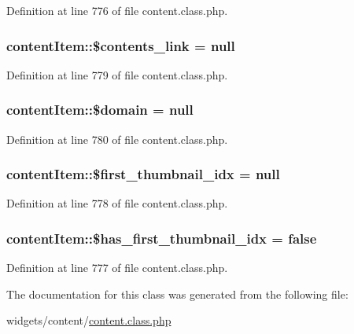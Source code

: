 Definition at line 776 of file content.\+class.\+php.

\subsubsection[{\texorpdfstring{\$contents\+\_\+link}{$contents_link}}]{\setlength{\rightskip}{0pt plus 5cm}content\+Item\+::\$contents\+\_\+link = {\bf null}}\hypertarget{classcontentItem_a6bf076b1d98025ee3f1d847fcf1fd29f}{}\label{classcontentItem_a6bf076b1d98025ee3f1d847fcf1fd29f}


Definition at line 779 of file content.\+class.\+php.

\subsubsection[{\texorpdfstring{\$domain}{$domain}}]{\setlength{\rightskip}{0pt plus 5cm}content\+Item\+::\$domain = {\bf null}}\hypertarget{classcontentItem_a428d40bc2148eae5661822963ba819b4}{}\label{classcontentItem_a428d40bc2148eae5661822963ba819b4}


Definition at line 780 of file content.\+class.\+php.

\subsubsection[{\texorpdfstring{\$first\+\_\+thumbnail\+\_\+idx}{$first_thumbnail_idx}}]{\setlength{\rightskip}{0pt plus 5cm}content\+Item\+::\$first\+\_\+thumbnail\+\_\+idx = {\bf null}}\hypertarget{classcontentItem_a3ed95afadefbe20bd085e1d88220f4b1}{}\label{classcontentItem_a3ed95afadefbe20bd085e1d88220f4b1}


Definition at line 778 of file content.\+class.\+php.

\subsubsection[{\texorpdfstring{\$has\+\_\+first\+\_\+thumbnail\+\_\+idx}{$has_first_thumbnail_idx}}]{\setlength{\rightskip}{0pt plus 5cm}content\+Item\+::\$has\+\_\+first\+\_\+thumbnail\+\_\+idx = false}\hypertarget{classcontentItem_a78da7867160d34bf7e422524f6a78c37}{}\label{classcontentItem_a78da7867160d34bf7e422524f6a78c37}


Definition at line 777 of file content.\+class.\+php.



The documentation for this class was generated from the following file\+:\begin{DoxyCompactItemize}
\item 
widgets/content/\hyperlink{content_8class_8php}{content.\+class.\+php}\end{DoxyCompactItemize}
